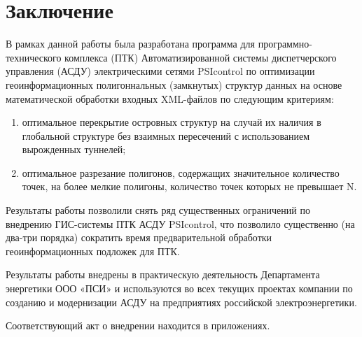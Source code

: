 \section{Заключение}
\label{}

В рамках данной работы была разработана программа для программно-технического комплекса (ПТК) Автоматизированной системы диспетчерского управления (АСДУ) электрическими сетями PSIcontrol по оптимизации геоинформационных полигоннальных (замкнутых) структур данных на основе математической обработки входных XML-файлов по следующим критериям:

\begin{enumerate}
\item оптимальное перекрытие островных структур на случай их наличия в глобальной структуре без взаимных пересечений с использованием вырожденных туннелей;
\item оптимальное разрезание полигонов, содержащих значительное количество точек, на более мелкие полигоны, количество точек которых не превышает N.
\end{enumerate}

Результаты работы позволили снять ряд существенных ограничений по внедрению ГИС-системы ПТК АСДУ PSIcontrol, что позволило существенно (на два-три порядка) сократить время предварительной обработки геоинформационных подложек для ПТК.

Результаты работы внедрены в практическую деятельность Департамента энергетики ООО «ПСИ» и используются во всех текущих проектах компании по созданию и модернизации АСДУ на предприятиях российской электроэнергетики.

Соответствующий акт о внедрении находится в приложениях.